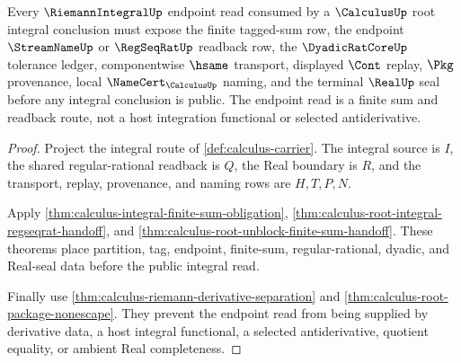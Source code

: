 \begin{theorem}
\label{thm:calculus-root-unblock-riemann-endpoint-readback}
Every $\RiemannIntegralUp$ endpoint read consumed by a $\CalculusUp$ root integral conclusion must expose the finite tagged-sum row, the endpoint $\StreamNameUp$ or $\RegSeqRatUp$ readback row, the $\DyadicRatCoreUp$ tolerance ledger, componentwise $\hsame$ transport, displayed $\Cont$ replay, $\Pkg$ provenance, local $\NameCert_{\CalculusUp}$ naming, and the terminal $\RealUp$ seal before any integral conclusion is public. The endpoint read is a finite sum and readback route, not a host integration functional or selected antiderivative.
\end{theorem}
\begin{proof}
Project the integral route of \autoref{def:calculus-carrier}. The integral source is $I$, the shared regular-rational readback is $Q$, the Real boundary is $R$, and the transport, replay, provenance, and naming rows are $H,T,P,N$.

Apply \autoref{thm:calculus-integral-finite-sum-obligation}, \autoref{thm:calculus-root-integral-regseqrat-handoff}, and \autoref{thm:calculus-root-unblock-finite-sum-handoff}. These theorems place partition, tag, endpoint, finite-sum, regular-rational, dyadic, and Real-seal data before the public integral read.

Finally use \autoref{thm:calculus-riemann-derivative-separation} and \autoref{thm:calculus-root-package-nonescape}. They prevent the endpoint read from being supplied by derivative data, a host integral functional, a selected antiderivative, quotient equality, or ambient Real completeness.
\end{proof}

